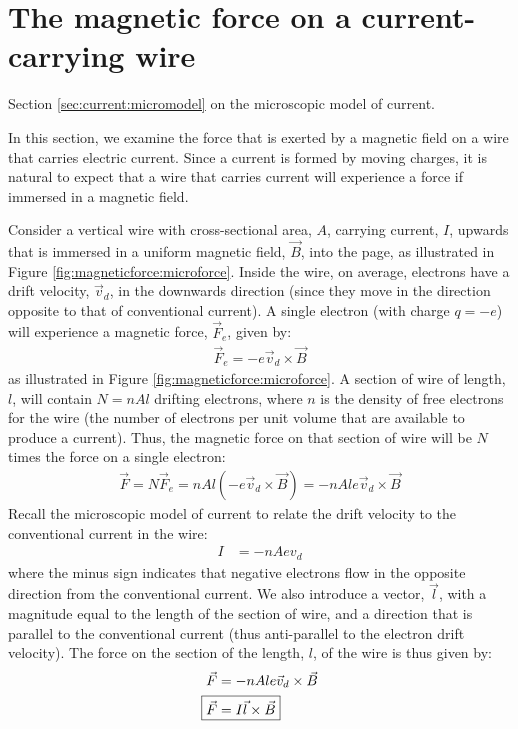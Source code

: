 \section{The magnetic force on a current-carrying wire}
\begin{review}
	\item Section \ref{sec:current:micromodel} on the microscopic model of current.
\end{review}

In this section, we examine the force that is exerted by a magnetic field on a wire that carries electric current. Since a current is formed by moving charges, it is natural to expect that a wire that carries current will experience a force if immersed in a magnetic field. 

Consider a vertical wire with cross-sectional area, $A$, carrying current, $I$, upwards that is immersed in a uniform magnetic field, $\vec B$, into the page, as illustrated in Figure \ref{fig:magneticforce:microforce}. Inside the wire, on average, electrons have a drift velocity, $\vec v_d$, in the downwards direction (since they move in the direction opposite to that of conventional current).
A single electron (with charge $q=-e$) will experience a magnetic force, $\vec F_e$, given by:
\begin{align*}
\vec F_e = -e \vec v_d \times \vec B
\end{align*}
as illustrated in Figure \ref{fig:magneticforce:microforce}. A section of wire of length, $l$, will contain $N=nAl$ drifting electrons, where $n$ is the density of free electrons for the wire (the number of electrons per unit volume that are available to produce a current). Thus, the magnetic force on that section of wire will be $N$ times the force on a single electron:
\begin{align*}
\vec F = N\vec F_e = nAl (-e \vec v_d \times \vec B)=-nAle \vec v_d \times \vec B
\end{align*}
Recall the microscopic model of current to relate the drift velocity to the conventional current in the wire:
\begin{align*}
I &= -nAev_d
\end{align*}
where the minus sign indicates that negative electrons flow in the opposite direction from the conventional current. We also introduce a vector, $\vec l$, with a magnitude equal to the length of the section of wire, and a direction that is parallel to the conventional current (thus anti-parallel to the electron drift velocity). The force on the section of the length, $l$, of the wire is thus given by:
\begin{align*}
\vec F &= -nAle \vec v_d \times \vec B\\
\Aboxed{ \vec F&= I \vec l \times \vec B}
\end{align*}

